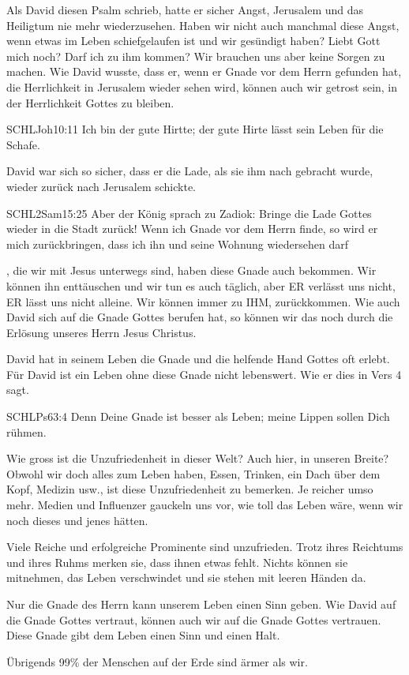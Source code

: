 \documentclass[14pt]{../../inc/mybib}
\begin{document}
    \begin{block}
        Als David diesen Psalm schrieb, hatte er sicher Angst, Jerusalem und das Heiligtum nie mehr wiederzusehen. Haben wir nicht auch manchmal diese Angst, wenn etwas im Leben schiefgelaufen ist und wir gesündigt haben? Liebt Gott mich  noch? Darf ich  zu ihm kommen? Wir brauchen uns aber keine Sorgen zu machen. Wie David wusste, dass er, wenn er Gnade vor dem Herrn gefunden hat, die Herrlichkeit in Jerusalem wieder sehen wird, können auch wir getrost sein, in der Herrlichkeit Gottes zu bleiben. 
          \begin{bibelbox}{SCHL}{Joh}{10:11}
            Ich bin der gute Hirtte; der gute Hirte lässt sein Leben für die Schafe.
        \end{bibelbox}
        David war sich so sicher, dass er die Lade, als sie ihm nach gebracht wurde, wieder zurück nach Jerusalem schickte.
        \begin{bibelbox}{SCHL}{2Sam}{15:25}
            Aber der König sprach zu Zadiok: Bringe die Lade Gottes wieder in die Stadt zurück! Wenn ich Gnade vor dem Herrn finde, so wird er mich zurückbringen, dass ich ihn und seine Wohnung wiedersehen darf
        \end{bibelbox}
        , die wir mit Jesus unterwegs sind, haben diese Gnade auch bekommen. Wir können ihn enttäuschen und wir tun es auch täglich, aber ER verlässt uns nicht, ER lässt uns nicht alleine. Wir können immer zu IHM,  zurückkommen. Wie auch David sich auf die Gnade Gottes berufen hat, so können wir das noch  durch die Erlösung unseres Herrn Jesus Christus.
    \end{block}
    \begin{block}
        David hat in seinem Leben die Gnade und die helfende Hand Gottes oft erlebt. Für David ist ein Leben ohne diese Gnade nicht lebenswert. Wie er dies in Vers 4 sagt.
        \begin{bibelbox}{SCHL}{Ps}{63:4}
            Denn Deine Gnade ist besser als Leben; meine Lippen sollen Dich rühmen.
        \end{bibelbox}
        Wie gross ist die Unzufriedenheit in dieser Welt? Auch hier, in unseren Breite? Obwohl wir doch alles zum Leben haben, Essen, Trinken, ein Dach über dem Kopf, Medizin usw., ist diese Unzufriedenheit zu bemerken. Je reicher umso mehr. Medien und Influenzer gauckeln uns vor, wie toll das Leben wäre, wenn wir noch dieses und jenes hätten.
        
        Viele Reiche und erfolgreiche Prominente sind unzufrieden. Trotz ihres Reichtums und ihres Ruhms merken sie, dass ihnen etwas fehlt. Nichts können sie mitnehmen, das Leben verschwindet und sie stehen mit leeren Händen da.
        
        Nur die Gnade des Herrn kann unserem Leben einen Sinn geben. Wie David auf die Gnade Gottes vertraut, können auch wir auf die Gnade Gottes vertrauen. Diese Gnade gibt dem Leben einen Sinn und einen Halt.

        Übrigends 99\% der Menschen auf der Erde sind ärmer als wir.
    \end{block}
\end{document}

